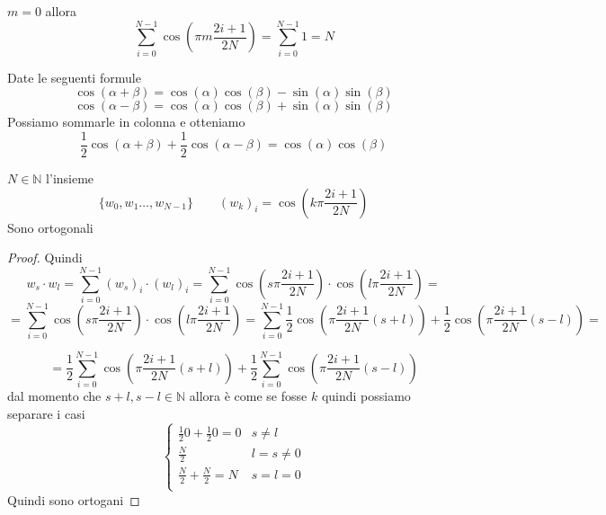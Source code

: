 \begin{proposizione}
    $m = 0$ allora
    \begin{equation}
        \sum_{i=0}^{N-1} \cos\left(\pi m \frac{2i+1}{2N}\right) = \sum_{i=0}^{N-1} 1 = N
    \end{equation}
\end{proposizione}

\begin{nota}
    Date le seguenti formule 
    $$\cos (\alpha + \beta) = \cos(\alpha) \cos (\beta) - \sin(\alpha)\sin(\beta)$$
    $$\cos (\alpha - \beta) = \cos(\alpha) \cos (\beta) + \sin(\alpha)\sin(\beta)$$
    Possiamo sommarle in colonna e otteniamo
    $$\frac{1}{2}\cos (\alpha + \beta)  + \frac{1}{2}\cos(\alpha-\beta) = \cos(\alpha) \cos(\beta)$$

\end{nota}

\begin{proposizione}
    $N\in\mathbb{N}$ l'insieme 
    \begin{equation}
        \{w_0,w_1\dots, w_{N-1}\} \qquad (w_k)_i  = \cos\left( k\pi \frac{2i+1}{2N}\right)
    \end{equation}
    Sono ortogonali
    \begin{proof}
        Quindi
        \begin{equation*}
            w_s\cdot w_l = \sum_{i= 0} ^{N-1} (w_s)_i\cdot (w_l)_i  = \sum_{i= 0} ^{N-1}  \cos\left( s \pi \frac{2i+1}{2N}\right)\cdot  \cos \left( l\pi \frac{2i+1}{2N}\right)=
        \end{equation*} 
        \begin{equation*}
           = \sum_{i= 0} ^{N-1}  \cos\left( s \pi \frac{2i+1}{2N}\right)\cdot  \cos \left( l\pi \frac{2i+1}{2N}\right)=
           \sum_{i= 0} ^{N-1} \frac{1}{2} \cos\left( \pi \frac{2i+1}{2N}(s+l)\right)  + \frac{1}{2}\cos\left( \pi \frac{2i+1}{2N}(s-l)\right) =  
        \end{equation*} 

        \begin{equation*}
            =\frac{1}{2}\sum_{i= 0} ^{N-1}  \cos\left( \pi \frac{2i+1}{2N}(s+l)\right)  + \frac{1}{2}\sum_{i= 0} ^{N-1}\cos\left( \pi \frac{2i+1}{2N}(s-l)\right) 
         \end{equation*} 
        dal momento che $s+l, s-l\in \mathbb{N}$ allora è come se fosse $k$
        quindi possiamo separare i casi
        \begin{equation*}
            \begin{cases}
                \frac{1}{2} 0  + \frac{1}{2} 0 = 0 & s\ne l \\
                \frac{N}{2} & l = s  \ne 0\\ 
                \frac{N}{2} + \frac{N}{2} = N & s=l =0\\
            \end{cases}
        \end{equation*}
        Quindi sono ortogani
    \end{proof}
\end{proposizione}

